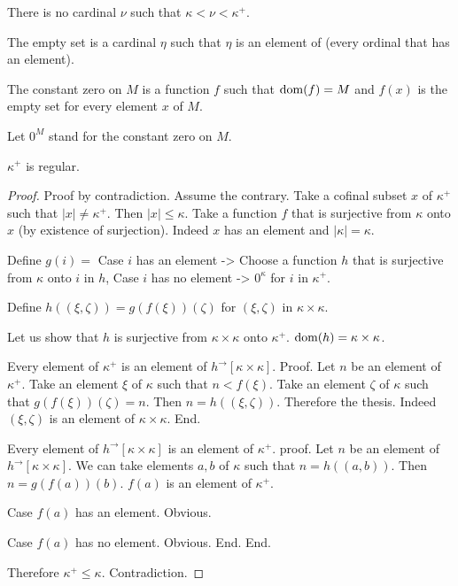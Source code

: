 \documentclass{article}
\newcommand{\Prod}[2]{#1\times #2}
\newcommand{\Succ}[1]{#1^{+}}
\newcommand{\image}[2]{#1^{\to}[#2]}
\newcommand{\card}[1]{\left|#1\right|}
\begin{document}
\begin{forthel}
    \begin{axiom}
      There is no cardinal $\nu$ such that $\kappa < \nu < \Succ{\kappa}$.
    \end{axiom}

    \begin{definition}
      The empty set is a cardinal $\eta$ such that $\eta$
      is an element of (every ordinal that has an element).
    \end{definition}

    \begin{definition}
      The constant zero on $M$ is a function $f$ such that $\operatorname{dom}(f) = M$ and $f(x)$ is the empty set for every element $x$ of $M$.
    \end{definition}

    Let $0^M$ stand for the constant zero on $M$.

    \begin{theorem}
      $\Succ{\kappa}$ is regular.
    \end{theorem}
    \begin{proof}
      Proof by contradiction. Assume the contrary.
      Take a cofinal subset $x$ of $\Succ{\kappa}$ such that $\card{x} \neq \Succ{\kappa}$.
      Then $\card{x} \leq \kappa$.
      Take a function $f$ that is surjective from $\kappa$ onto $x$ (by existence of surjection).
      Indeed $x$ has an element and $\card{\kappa} = \kappa$.

      Define $g(i) =$
        Case $i$ has an element -> Choose a function $h$ that is surjective from $\kappa$ onto $i$ in $h$,
        Case $i$ has no element -> $0^\kappa$
      for $i$ in $\Succ{\kappa}$.

      Define $h((\xi,\zeta)) = g(f(\xi))(\zeta)$ for $(\xi,\zeta)$ in $\Prod{\kappa}{\kappa}$.

      Let us show that $h$ is surjective from $\Prod{\kappa}{\kappa}$ onto $\Succ{\kappa}$.
      $\dom(h) = \Prod{\kappa}{\kappa}$.

        Every element of $\Succ{\kappa}$ is an element of $\image{h}{\Prod{\kappa}{\kappa}}$.
        Proof.
          Let $n$ be an element of $\Succ{\kappa}$.
          Take an element $\xi$ of $\kappa$ such that $n < f(\xi)$.
          Take an element $\zeta$ of $\kappa$ such that $g(f(\xi))(\zeta) = n$.
          Then $n = h((\xi,\zeta))$.
          Therefore the thesis.
          Indeed $(\xi,\zeta)$ is an element of $\Prod{\kappa}{\kappa}$.
        End.

        Every element of $\image{h}{\Prod{\kappa}{\kappa}}$ is an element of $\Succ{\kappa}$.
        proof.
          Let $n$ be an element of $\image{h}{\Prod{\kappa}{\kappa}}$.
          We can take elements $a,b$ of $\kappa$ such that $n = h((a,b))$.
          Then $n = g(f(a))(b)$. $f(a)$ is an element of $\Succ{\kappa}$.

          Case $f(a)$ has an element. Obvious.

          Case $f(a)$ has no element. Obvious.
        End.
      End.

      Therefore $\Succ{\kappa} \leq \kappa$. Contradiction.
    \end{proof}
  \end{forthel}
\end{document}
